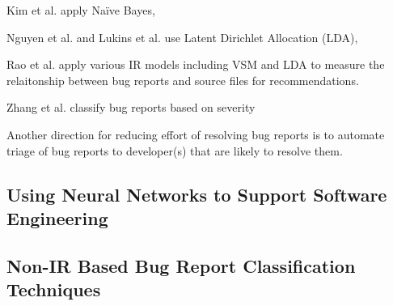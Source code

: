 Kim et al. \cite{Kim:2013:WFT:2554428.2554437} apply Na\"{i}ve Bayes, 

Nguyen et al. \cite{Nguyen:2011:TAN:2190078.2190181} and Lukins et al. \cite{Lukins:2010:BLU:1824820.1824850} use Latent Dirichlet Allocation (LDA), 

Rao et al. \cite{Rao:2011:RSL:1985441.1985451} apply various IR models including VSM and LDA to measure the relaitonship between bug reports and source files for recommendations.

Zhang et al. \cite{Zhang:2016:TMA:2949080.2949249} classify bug reports based on severity

Another direction for reducing effort of resolving bug reports is to automate triage of bug reports to developer(s) that are likely to resolve them. \cite{Anvik2011ReducingTE, Hu2014EffectiveBT, Zhang2013AHB, Xuan2015TowardsEB}

\subsection{Using Neural Networks to Support Software Engineering}

\cite{8255666, Huo:2017:EUF:3172077.3172153}

\subsection{Non-IR Based Bug Report Classification Techniques}

\cite{Cleve:2005:LCP:1062455.1062522, Dit:2013:IIR:2436118.2436134, Poshyvanyk:2013:CLU:2377656.2377660, Poshyvanyk:2007:FLU:1263152.1263534, Liu:2005:SSM:1081706.1081753, Jin:2013:FFL:2483760.2483763, B.Le:2016:LBF:2931037.2931049, Le:2015:IRS:2786805.2786880, Jones:2005:EET:1101908.1101949}